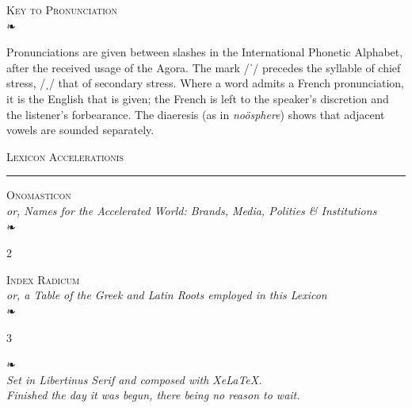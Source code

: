 \documentclass[10pt,twoside]{article}
\begin{document}
\vspace{3mm}
\begin{center}
{\dispfont\large\scshape Key to Pronunciation}\\[2pt]
{\color{rubric}❧}
\end{center}
{\footnotesize
Pronunciations are given between slashes in the International Phonetic Alphabet, after the received usage of the Agora. The mark /ˈ/ precedes the syllable of chief stress, /ˌ/ that of secondary stress. Where a word admits a French pronunciation, it is the English that is given; the French is left to the speaker's discretion and the listener's forbearance. The diaeresis (as in \textit{noösphere}) shows that adjacent vowels are sounded separately.\par}

\clearpage

\pagestyle{dict}
\setcounter{page}{1}
\fontsize{8.3}{9.5}\selectfont
\begin{center}
{\dispfont\LARGE\scshape Lexicon Accelerationis}\\[3pt]
{\color{rubric}\rule{0.4\textwidth}{0.4pt}}
\end{center}
\vspace{1mm}



\clearpage
\begin{center}
{\dispfont\Large\scshape Onomasticon}\\[1pt]
{\itshape\small or, Names for the Accelerated World: Brands, Media, Polities \& Institutions}\\[2pt]
{\color{rubric}❧}
\end{center}
\begin{multicols}{2}
\footnotesize\raggedright

\end{multicols}

\clearpage
\begin{center}
{\dispfont\Large\scshape Index Radicum}\\[1pt]
{\itshape\small or, a Table of the Greek and Latin Roots employed in this Lexicon}\\[2pt]
{\color{rubric}❧}
\end{center}
\begin{multicols}{3}
\scriptsize\raggedright

\end{multicols}

\vfill
\begin{center}
{\color{rubric}❧}\\[4pt]
{\footnotesize\itshape
Set in Libertinus Serif and composed with Xe\LaTeX.\\
Finished the day it was begun, there being no reason to wait.}
\end{center}
\end{document}
